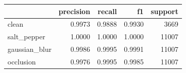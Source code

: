 \begin{tabular}{lrrrr}
\toprule
 & precision & recall & f1 & support \\
\midrule
clean & 0.9973 & 0.9888 & 0.9930 & 3669 \\
salt_pepper & 1.0000 & 1.0000 & 1.0000 & 11007 \\
gaussian_blur & 0.9986 & 0.9995 & 0.9991 & 11007 \\
occlusion & 0.9976 & 0.9995 & 0.9985 & 11007 \\
\bottomrule
\end{tabular}
